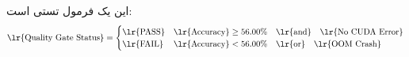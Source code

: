 \documentclass[12pt,a4paper]{report}
\begin{document}
این یک فرمول تستی است:
\begin{equation}
\text{\lr{Quality Gate Status}} = \begin{cases}
\text{\lr{PASS}} & \text{\lr{Accuracy}} \ge 56.00\% \quad \text{\lr{and}} \quad \text{\lr{No CUDA Error}} \\
\text{\lr{FAIL}} & \text{\lr{Accuracy}} < 56.00\% \quad \text{\lr{or}} \quad \text{\lr{OOM Crash}}
\end{cases}
\end{equation}
\end{document}
